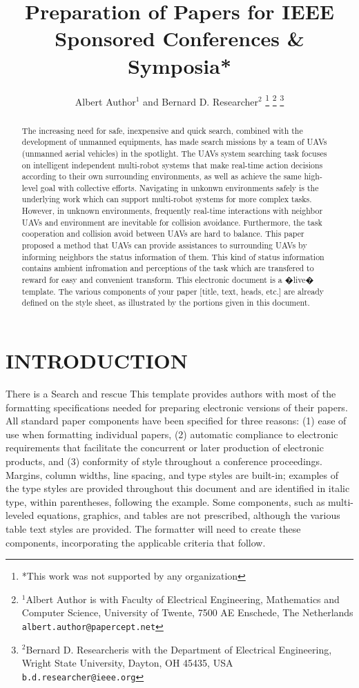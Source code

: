 \documentclass[letterpaper, 10 pt, conference]{ieeeconf}  %
\title{\LARGE \bf
Preparation of Papers for IEEE Sponsored Conferences \& Symposia*
}
\author{Albert Author$^{1}$ and Bernard D. Researcher$^{2}$%
\thanks{*This work was not supported by any organization}%
\thanks{$^{1}$Albert Author is with Faculty of Electrical Engineering, Mathematics and Computer Science,
        University of Twente, 7500 AE Enschede, The Netherlands
        {\tt\small albert.author@papercept.net}}%
\thanks{$^{2}$Bernard D. Researcheris with the Department of Electrical Engineering, Wright State University,
        Dayton, OH 45435, USA
        {\tt\small b.d.researcher@ieee.org}}%
}
\begin{document}
\maketitle
\thispagestyle{empty}
\pagestyle{empty}


\begin{abstract}

The increasing need for safe, inexpensive and quick search, combined with the development of unmanned equipments, has made search missions by a team of UAVs (unmanned aerial vehicles) in the spotlight.
The UAVs system searching task focuses on intelligent independent multi-robot systems that make real-time action decisions according to their own surrounding environments, as well as achieve the same high-level goal with collective efforts.
Navigating in unkonwn environments safely is the underlying work which can support multi-robot systems for more complex tasks.
However, in unknown environments, frequently real-time interactions with neighbor UAVs and environment are inevitable for collision avoidance.
Furthermore, the task cooperation and collision avoid between UAVs are hard to balance.
This paper proposed a method that UAVs can provide assistances to surrounding UAVs by informing neighbors the status information of them. 
This kind of status information contains ambient infromation and perceptions of the task which are transfered to reward for easy and convenient transform.
This electronic document is a �live� template. The various components of your paper [title, text, heads, etc.] are already defined on the style sheet, as illustrated by the portions given in this document.

\end{abstract}


\section{INTRODUCTION}

There is a 
Search and rescue  
This template provides authors with most of the formatting specifications needed for preparing electronic versions of their papers. All standard paper components have been specified for three reasons: (1) ease of use when formatting individual papers, (2) automatic compliance to electronic requirements that facilitate the concurrent or later production of electronic products, and (3) conformity of style throughout a conference proceedings. Margins, column widths, line spacing, and type styles are built-in; examples of the type styles are provided throughout this document and are identified in italic type, within parentheses, following the example. Some components, such as multi-leveled equations, graphics, and tables are not prescribed, although the various table text styles are provided. The formatter will need to create these components, incorporating the applicable criteria that follow.
\end{document}
